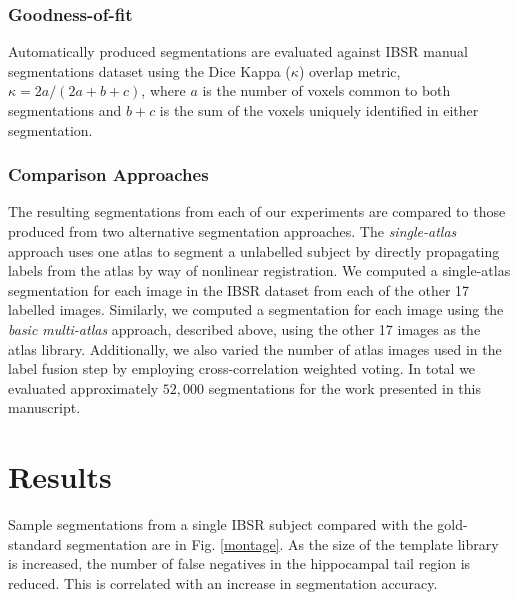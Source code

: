 \documentclass{article}\usepackage{graphicx, color}
\begin{document}
\subsubsection{Goodness-of-fit}
Automatically produced segmentations are evaluated against IBSR manual
segmentations dataset using the Dice Kappa ($\kappa$) overlap metric, $\kappa =
{2a}/{(2a+b+c)}$, where $a$ is the number of voxels common to both
segmentations and $b+c$ is the sum of the voxels uniquely identified in either
segmentation.

\subsubsection{Comparison Approaches}
The resulting segmentations from each of our experiments are compared to those
produced from two alternative segmentation approaches. The {\it single-atlas}
approach uses one atlas to segment a unlabelled subject by directly propagating
labels from the atlas by way of nonlinear registration.  We computed a
single-atlas segmentation for each image in the IBSR dataset from each of the
other 17 labelled images.  Similarly, we computed a segmentation for each image
using the {\it basic multi-atlas} approach, described above, using the
other 17 images as the atlas library.  Additionally, we also varied the number
of atlas images used in the label fusion step by employing cross-correlation
weighted voting.  In total we evaluated approximately $52,000$ segmentations
for the work presented in this manuscript.

\section{Results}

Sample segmentations from a single IBSR subject compared with the gold-standard
segmentation are in Fig.  \ref{montage}.  As the size of the template library
is increased, the number of false negatives in the hippocampal tail region is
reduced.  This is correlated with an increase in segmentation accuracy.
\end{document}

